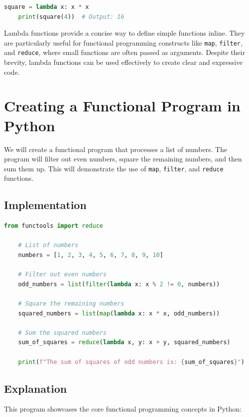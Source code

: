 \documentclass[a4paper]{article}
\begin{document}
\begin{lstlisting}[language=Python, caption=Anonymous Functions (Lambdas)]
    square = lambda x: x * x
    print(square(4))  # Output: 16
\end{lstlisting}

Lambda functions provide a concise way to define simple functions inline. They are particularly useful for functional programming constructs like \texttt{map}, \texttt{filter}, and \texttt{reduce}, where small functions are often passed as arguments. Despite their brevity, lambda functions can be used effectively to create clear and expressive code.\\

\newpage
\section{Creating a Functional Program in Python}
We will create a functional program that processes a list of numbers. The program will filter out even numbers, square the remaining numbers, and then sum them up. This will demonstrate the use of \texttt{map}, \texttt{filter}, and \texttt{reduce} functions.\\

\subsection{Implementation}

\begin{lstlisting}[language=Python, caption=Functional Program Demo]
    from functools import reduce

    # List of numbers
    numbers = [1, 2, 3, 4, 5, 6, 7, 8, 9, 10]

    # Filter out even numbers
    odd_numbers = list(filter(lambda x: x % 2 != 0, numbers))

    # Square the remaining numbers
    squared_numbers = list(map(lambda x: x * x, odd_numbers))

    # Sum the squared numbers
    sum_of_squares = reduce(lambda x, y: x + y, squared_numbers)

    print(f"The sum of squares of odd numbers is: {sum_of_squares}")
\end{lstlisting}

\subsection{Explanation}
This program showcases the core functional programming concepts in Python:
\end{document}
